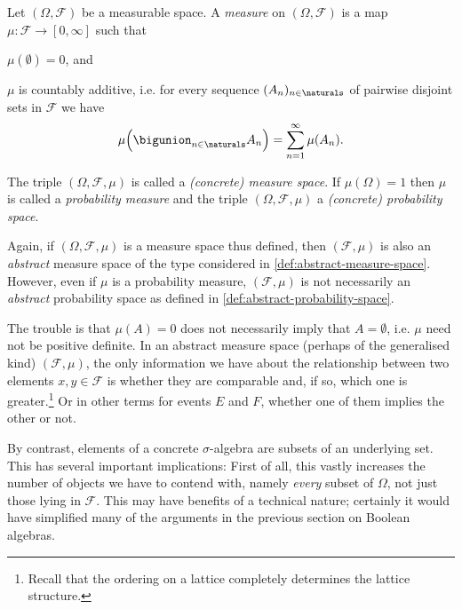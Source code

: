 \documentclass[article, a4paper, 11pt, oneside]{memoir}
\numberwithin{equation}{chapter}
\newcommand{\calF}{\mathcal{F}}
\begin{document}
\begin{definition}
    Let $(\Omega, \calF)$ be a measurable space. A \emph{measure} on $(\Omega, \calF)$ is a map $\mu \colon \calF \to [0,\infty]$ such that
    \begin{enumdef}
        \item $\mu(\emptyset) = 0$, and
        \item $\mu$ is countably additive, i.e. for every sequence $(A_n)_{n\in\naturals}$ of pairwise disjoint sets in $\calF$ we have
        \begin{equation*}
            \mu \Bigl( \bigunion_{n\in\naturals} A_n \Bigr)
                = \sum_{n=1}^\infty \mu(A_n).
        \end{equation*}
    \end{enumdef}
    The triple $(\Omega, \calF, \mu)$ is called a \emph{(concrete) measure space}. If $\mu(\Omega) = 1$ then $\mu$ is called a \emph{probability measure} and the triple $(\Omega, \calF, \mu)$ a \emph{(concrete) probability space}.
\end{definition}
%
Again, if $(\Omega, \calF, \mu)$ is a measure space thus defined, then $(\calF, \mu)$ is also an \emph{abstract} measure space of the type considered in \cref{def:abstract-measure-space}. However, even if $\mu$ is a probability measure, $(\calF, \mu)$ is not necessarily an \emph{abstract} probability space as defined in \cref{def:abstract-probability-space}.

The trouble is that $\mu(A) = 0$ does not necessarily imply that $A = \emptyset$, i.e. $\mu$ need not be positive definite. In an abstract measure space (perhaps of the generalised kind) $(\calF,\mu)$, the only information we have about the relationship between two elements $x,y \in \calF$ is whether they are comparable and, if so, which one is greater.\footnote{Recall that the ordering on a lattice completely determines the lattice structure.} Or in other terms for events $E$ and $F$, whether one of them implies the other or not.

By contrast, elements of a concrete $\sigma$-algebra are subsets of an underlying set. This has several important implications: First of all, this vastly increases the number of objects we have to contend with, namely \emph{every} subset of $\Omega$, not just those lying in $\calF$. This may have benefits of a technical nature; certainly it would have simplified many of the arguments in the previous section on Boolean algebras.
\end{document}
